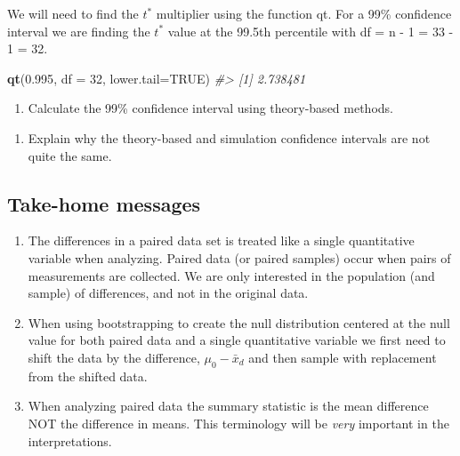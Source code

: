 \documentclass[
]{report}
\newenvironment{Shaded}{\begin{snugshade}}{\end{snugshade}}
\newcommand{\CommentTok}[1]{\textcolor[rgb]{0.56,0.35,0.01}{\textit{#1}}}
\newcommand{\DataTypeTok}[1]{\textcolor[rgb]{0.13,0.29,0.53}{#1}}
\newcommand{\DecValTok}[1]{\textcolor[rgb]{0.00,0.00,0.81}{#1}}
\newcommand{\FloatTok}[1]{\textcolor[rgb]{0.00,0.00,0.81}{#1}}
\newcommand{\KeywordTok}[1]{\textcolor[rgb]{0.13,0.29,0.53}{\textbf{#1}}}
\newcommand{\NormalTok}[1]{#1}
\newcommand{\OtherTok}[1]{\textcolor[rgb]{0.56,0.35,0.01}{#1}}
\providecommand{\tightlist}{%
  \setlength{\itemsep}{0pt}\setlength{\parskip}{0pt}}
\begin{document}
We will need to find the \(t^*\) multiplier using the function qt. For a 99\% confidence interval we are finding the \(t^*\) value at the 99.5th percentile with df = n - 1 = 33 - 1 = 32.

\begin{Shaded}
\begin{Highlighting}[]
\KeywordTok{qt}\NormalTok{(}\FloatTok{0.995}\NormalTok{, }\DataTypeTok{df =} \DecValTok{32}\NormalTok{, }\DataTypeTok{lower.tail=}\OtherTok{TRUE}\NormalTok{)}
\CommentTok{\#\textgreater{} [1] 2.738481}
\end{Highlighting}
\end{Shaded}

\begin{enumerate}
\def\labelenumi{\arabic{enumi}.}
\setcounter{enumi}{4}
\tightlist
\item
  Calculate the 99\% confidence interval using theory-based methods.
\end{enumerate}

\vspace{1in}

\begin{enumerate}
\def\labelenumi{\arabic{enumi}.}
\setcounter{enumi}{5}
\tightlist
\item
  Explain why the theory-based and simulation confidence intervals are not quite the same.
\end{enumerate}

\vspace{1in}

\hypertarget{take-home-messages-9}{%
\subsection{Take-home messages}\label{take-home-messages-9}}

\begin{enumerate}
\def\labelenumi{\arabic{enumi}.}
\item
  The differences in a paired data set is treated like a single quantitative variable when analyzing. Paired data (or paired samples) occur when pairs of measurements are collected. We are only interested in the population (and sample) of differences, and not in the original data.
\item
  When using bootstrapping to create the null distribution centered at the null value for both paired data and a single quantitative variable we first need to shift the data by the difference, \(\mu_0 - \bar{x}_d\) and then sample with replacement from the shifted data.
\item
  When analyzing paired data the summary statistic is the mean difference NOT the difference in means. This terminology will be \emph{very} important in the interpretations.
\end{enumerate}
\end{document}
